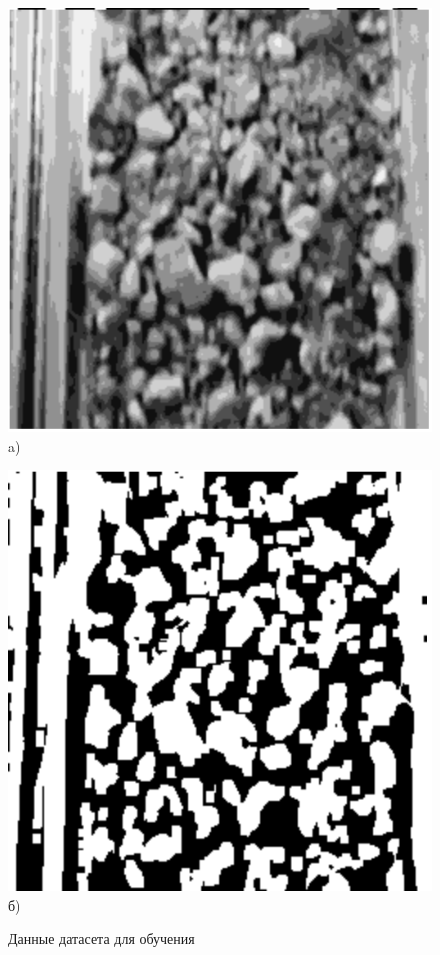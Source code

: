 \documentclass[times]{itmo-student-thesis}
\begin{document}
\begin{figure}[h!]
	\begin{minipage}[h]{0.49\linewidth}
		\centering
		\includegraphics[width=0.9\linewidth]{images/train1} \\ a)
	\end{minipage}
	\hfill
	\begin{minipage}[h]{0.49\linewidth}
		\centering
		\includegraphics[width=0.9\linewidth]{images/train2} \\ б)
	\end{minipage}
	\caption{Данные датасета для обучения}
	\label{fig:dataset}
\end{figure}
\end{document}
